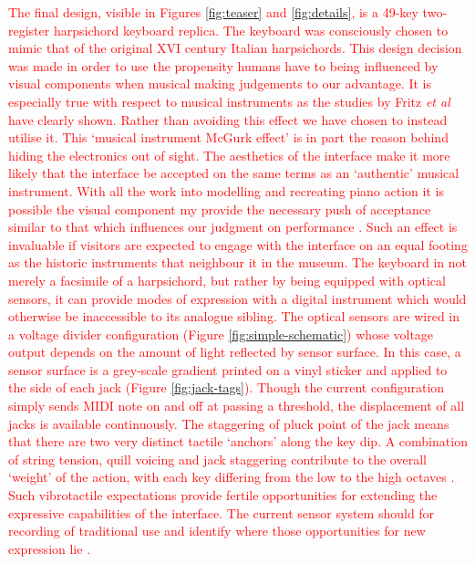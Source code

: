 \textcolor{red}{
The final design, visible in Figures \ref{fig:teaser} and \ref{fig:details}, is a 49-key two-register harpsichord keyboard replica.
The keyboard was consciously chosen to mimic that of the original XVI century Italian harpsichords. This design decision was made in order to use the propensity humans have to being influenced by visual components when musical making judgements \cite{Tsay2013} to our advantage. It is especially true with respect to musical instruments as the studies by Fritz \emph{et al}\cite{Fritz2012, Fritz2014, Fritz2017} have clearly shown. Rather than avoiding this effect we have chosen to instead utilise it. This `musical instrument McGurk effect' is in part the reason behind hiding the electronics out of sight. 
The aesthetics of the interface make it more likely that the interface be accepted on the same terms as an `authentic' musical instrument. With all the work into modelling and recreating piano action \cite{Cadoz1990, Gillespie1996, Timmermans2020} it is possible the visual component my provide the necessary push of acceptance similar to that which influences our judgment on performance \cite{Tsay2013}. 
Such an effect is invaluable if visitors are expected to engage with the interface on an equal footing as the historic instruments that neighbour it in the museum.
The keyboard in not merely a facsimile of a harpsichord, but rather by being equipped with optical sensors, it can provide modes of expression with a digital instrument which would otherwise be inaccessible to its analogue sibling. 
The optical sensors are wired in a voltage divider configuration (Figure \ref{fig:simple-schematic}) whose voltage output depends on the amount of light reflected by sensor surface. In this case, a sensor surface is a grey-scale gradient printed on a vinyl sticker and applied to the side of each jack (Figure \ref{fig:jack-tags}). Though the current configuration simply sends MIDI note on and off at passing a threshold, the displacement of all jacks is available continuously.
The staggering of pluck point of the jack means that there are two very distinct tactile `anchors' along the key dip. A combination of string tension, quill voicing and jack staggering contribute to the overall `weight' of the action, with each key differing from the low to the high octaves \cite{Veroli2012}. Such vibrotactile expectations provide fertile opportunities for extending the expressive capabilities of the interface. The current sensor system should for recording of traditional use and identify where those opportunities for new expression lie \cite{McPherson2013-2}. 
}

